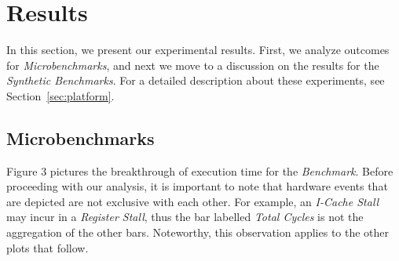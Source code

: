 \section{Results}
\label{sec:results}

	In this section, we present our experimental results. First, we
	analyze outcomes for \textit{Microbenchmarks}, and next we move to a
	discussion on the results for the \textit{Synthetic Benchmarks}. For
	a detailed description about these experiments, see
	Section~\ref{sec:platform}.

\subsection{Microbenchmarks}

	Figure 3%
	pictures the breakthrough of execution
	time for the \textit{Benchmark}. Before proceeding with our
	analysis, it is important to note that hardware events that are
	depicted are not exclusive with each other. For example, an
	\textit{I-Cache Stall} may incur in a \textit{Register Stall}, thus
	the bar labelled \textit{Total Cycles} is not the aggregation of the
	other bars. Noteworthy, this observation applies to the other plots
	that follow.

